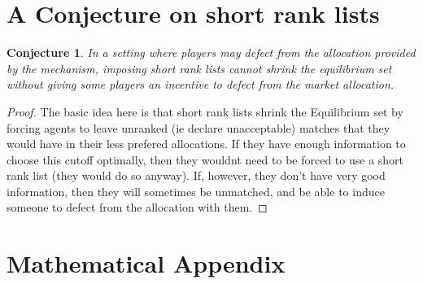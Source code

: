 \documentclass[WP]{AEA}
\newtheorem{conj}{Conjecture}
\begin{document}
\section{A Conjecture on short rank lists}
\begin{conj}
	 In a setting where players may defect from the allocation provided by the mechanism, imposing short rank lists cannot shrink the equilibrium set without giving some players an incentive to defect from the market allocation.
\end{conj}
\begin{proof}
	The basic idea here is that short rank lists shrink the Equilibrium set by forcing agents to leave unranked (ie declare unacceptable) matches that they would have in their less prefered allocations.  If they have enough information to choose this cutoff optimally, then they wouldnt need to be forced to use a short rank list (they would do so anyway).  If, however, they don't have very good information, then they will sometimes be unmatched, and be able to induce someone to defect from the allocation with them. 
\end{proof}




\appendix



\section{Mathematical Appendix}
\end{document}
